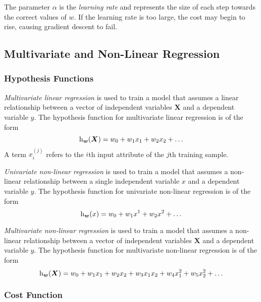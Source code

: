 The parameter \( \alpha \) is the \emph{learning rate} and represents the size of each step towards the correct values of \( w \).
If the learning rate is too large, the cost may begin to rise, causing gradient descent to fail.

\subsection{Multivariate and Non-Linear Regression}

\subsubsection{Hypothesis Functions}

\emph{Multivariate linear regression} is used to train a model that assumes a linear relationship between a vector of independent variables \( \boldsymbol{X} \) and a dependent variable \( y \).
The hypothesis function for multivariate linear regression is of the form
\begin{equation*}
  \function[_{\boldsymbol{w}}]{h}{\boldsymbol{X}} = w_{0} + w_{1} x_{1} + w_{2} x_{2} + \ldots
\end{equation*}
A term \( x^{(j)}_{i} \) refers to the \( i \)th input attribute of the \( j \)th training sample.

\emph{Univariate non-linear regression} is used to train a model that assumes a non-linear relationship between a single independent variable \( x \) and a dependent variable \( y \).
The hypothesis function for univariate non-linear regression is of the form
\begin{equation*}
  \function[_{\boldsymbol{w}}]{h}{x} = w_{0} + w_{1} x^{1} + w_{2} x^{2} + \ldots
\end{equation*}

\emph{Multivariate non-linear regression} is used to train a model that assumes a non-linear relationship between a vector of independent variables \( \boldsymbol{X} \) and a dependent variable \( y \).
The hypothesis function for multivariate non-linear regression is of the form
\begin{equation*}
  \function[_{\boldsymbol{w}}]{h}{\boldsymbol{X}} = w_{0} + w_{1} x_{1} + w_{2} x_{2} + w_{3} x_{1} x_{2} + w_{4} x_{1}^{2} + w_{5} x_{2}^{2} + \ldots
\end{equation*}

\subsubsection{Cost Function}

